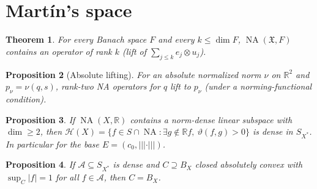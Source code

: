 \documentclass[10pt]{amsart}
\newtheorem{theorem}{Theorem}[section]
\newtheorem{proposition}[theorem]{Proposition}
\theoremstyle{remark}
\newcommand{\R}{\mathbb{R}}
\newcommand{\X}{\mathfrak{X}}
\newcommand{\NA}{\operatorname{NA}}
\newcommand{\tn}[1]{|\!|\!|#1|\!|\!|}
\begin{document}
\section{Mart\'in's space}\label{sec:martin}
\begin{theorem}\label{thm:finite-short}
For every Banach space $F$ and every $k\le\dim F$, $\NA(\X,F)$ contains an operator of rank $k$ (lift of $\sum_{j\le k}e_j\otimes u_j$).
\end{theorem}
\begin{proposition}[Absolute lifting]\label{prop:absolute-lifting}
For an absolute normalized norm $\nu$ on $\R^2$ and $p_\nu=\nu(q,s)$, rank-two NA operators for $q$ lift to $p_\nu$ (under a norming-functional condition).
\end{proposition}
\begin{proposition}\label{prop:density-bad-coordinates}
If $\NA(X,\R)$ contains a norm-dense linear subspace with $\dim\ge2$, then $\mathcal H(X)=\{f\in S\cap\NA: \exists g\notin\R f,\ \vartheta(f,g)>0\}$ is dense in $S_{X^*}$. In particular for the base $E=(c_0,\tn{\cdot})$.
\end{proposition}
\begin{proposition}\label{prop:no-simultaneous-preservation}
If $\mathcal A\subseteq S_{X^*}$ is dense and $C\supseteq B_X$ closed absolutely convex with $\sup_C|f|=1$ for all $f\in\mathcal A$, then $C=B_X$.
\end{proposition}
\end{document}
